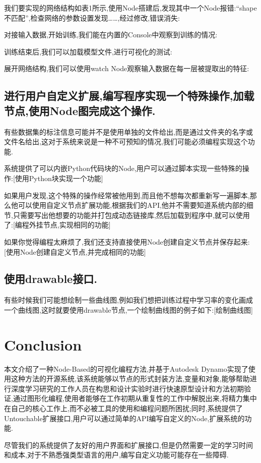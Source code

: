 \documentclass[10pt,journal,compsoc,UTF8]{IEEEtran}
\begin{document}
  我们要实现的网络结构如表1所示,使用Node搭建后,发现其中一个Node报错:“shape不匹配”,检查网络的参数设置发现……,经过修改,错误消失:
  
  对接输入数据,开始训练,我们能在内置的Console中观察到训练的情况:
  
  训练结束后,我们可以加载模型文件,进行可视化的测试:
  
	展开网络结构,我们可以使用watch Node观察输入数据在每一层被提取出的特征:
  \subsection{进行用户自定义扩展,编写程序实现一个特殊操作,加载节点,使用Node图完成这个操作.}
  有些数据集的标注信息可能并不是使用单独的文件给出,而是通过文件夹的名字或文件名给出,这对于系统来说是一种不可预知的情况,我们可能必须编程实现这个功能.

  系统提供了可以内嵌Python代码块的Node,用户可以通过脚本实现一些特殊的操作:[使用Python块实现一个功能]
  
  如果用户发现,这个特殊的操作经常被他用到,而且他不想每次都重新写一遍脚本,那么他可以使用自定义节点扩展功能,根据我们的API,他并不需要知道系统内部的细节,只需要写出他想要的功能并打包成动态链接库,然后加载到程序中,就可以使用了:[编程外挂节点,实现相同的功能]
  
	如果你觉得编程太麻烦了,我们还支持直接使用Node创建自定义节点并保存起来:[使用Node创建自定义节点,并完成相同的功能]
  \subsection{使用drawable接口.} 
  有些时候我们可能想绘制一些曲线图,例如我们想把训练过程中学习率的变化画成一个曲线图,这时就要使用drawable节点,一个绘制曲线图的例子如下:[绘制曲线图]
\section{Conclusion}
本文介绍了一种Node-Based的可视化编程方法,并基于Autodesk Dynamo实现了使用这种方法的开源系统,该系统能够以节点的形式封装方法,变量和对象,能够帮助进行深度学习研究的工作人员在构思和设计实验时进行快速原型设计和方法初期验证,通过图形化编程,使用者能够在工作初期从重复性的工作中解脱出来,将精力集中在自己的核心工作上,而不必被工具的使用和编程问题所困扰;同时,系统提供了Untouchable扩展接口,用户可以通过简单的API编写自定义的Node,扩展系统的功能.

尽管我们的系统提供了友好的用户界面和扩展接口,但是仍然需要一定的学习时间和成本,对于不熟悉强类型语言的用户,编写自定义功能可能存在一些障碍.
\end{document}
